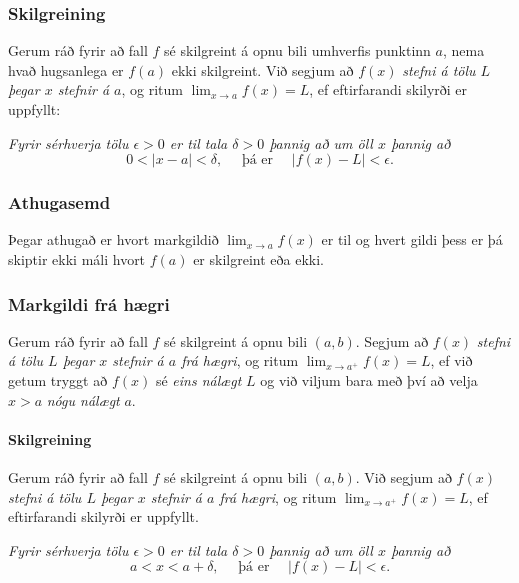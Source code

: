 \documentclass[icelandic,a4paper,12pt]{article}
\begin{document}
\pause

\subsubsection*{Skilgreining} Gerum ráð fyrir að fall $f$ sé
skilgreint á opnu bili umhverfis punktinn $a$, nema hvað hugsanlega er
$f(a)$ ekki skilgreint. \pause 
Við segjum að $f(x)$
\emph{stefni á tölu $L$ þegar $x$ stefnir á $a$}, og ritum
$\lim_{x\rightarrow a} f(x)=L$, ef eftirfarandi skilyrði er uppfyllt:

\emph{Fyrir sérhverja tölu $\epsilon>0$ er til tala $\delta>0$ 
þannig að um öll $x$ þannig að}
$$
0<|x-a|<\delta,\quad \text{ þá er } \quad |f(x)-L|<\epsilon.
$$


\pause

\subsubsection*{Athugasemd}  Þegar athugað er hvort markgildið
$\lim_{x\rightarrow a} f(x)$ er til og hvert gildi þess er þá skiptir
ekki máli hvort $f(a)$ er skilgreint eða ekki.



\subsubsection*{Markgildi frá hægri}
Gerum ráð fyrir að fall $f$ sé
skilgreint á opnu bili $(a,b)$.  Segjum að  $f(x)$
{\it stefni á tölu $L$ þegar $x$ stefnir á $a$ frá hægri}, og ritum
$\lim_{x\rightarrow a^+} f(x)=L$, ef við getum tryggt að  $f(x)$ sé 
{\em eins nálægt}
$L$ og við viljum bara með því að velja $x>a$ {\em nógu nálægt} $a$. 


\pause

\paragraph{Skilgreining} Gerum ráð fyrir að fall $f$ sé
skilgreint á opnu bili $(a,b)$.  Við segjum að $f(x)$
{\it stefni á tölu $L$ þegar $x$ stefnir á $a$ frá hægri}, og ritum
$\lim_{x\rightarrow a^+} f(x)=L$, ef eftirfarandi skilyrði er uppfyllt.

{\it Fyrir sérhverja tölu $\epsilon>0$ er til tala $\delta>0$ þannig
  að um öll $x$ þannig að} 
$$
a<x<a+\delta,\quad \text{ þá er } \quad |f(x)-L|<\epsilon.
$$
\end{document}
